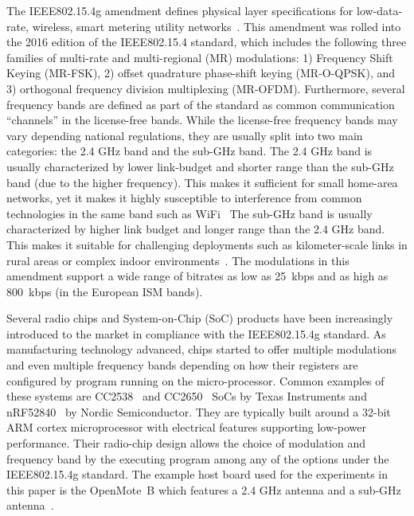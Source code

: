 \documentclass[sensors,article,submit,moreauthors,pdftex]{Definitions/mdpi}
\begin{document}
The IEEE802.15.4g amendment defines physical layer specifications for low-data-rate, wireless, smart metering utility networks~\cite{std_ieee802154g}.
This amendment was rolled into the 2016 edition of the IEEE802.15.4 standard, which includes the following three families of multi-rate and multi-regional (MR) modulations: 1) Frequency Shift Keying (MR-FSK), 2) offset quadrature phase-shift keying (MR-O-QPSK), and 3) orthogonal frequency division multiplexing (MR-OFDM).
Furthermore, several frequency bands are defined as part of the standard as common communication ``channels'' in the license-free bands.
While the license-free frequency bands may vary depending national regulations, they are usually split into two main categories: the 2.4 GHz band and the sub-GHz band. 
The 2.4 GHz band is usually characterized by lower link-budget and shorter range than the sub-GHz band (due to the higher frequency). 
This makes it sufficient for small home-area networks, yet it makes it highly susceptible to interference from common technologies in the same band such as WiFi~\cite{tuset19experimental}
The sub-GHz band is usually characterized by higher link budget and longer range than the 2.4 GHz band. 
This makes it suitable for challenging deployments such as kilometer-scale links in rural areas or complex indoor environments~\cite{munoz19km}.
The modulations in this amendment support a wide range of bitrates as low as 25~kbps and as high as 800~kbps (in the European ISM bands).


Several radio chips and System-on-Chip (SoC) products have been increasingly introduced to the market in compliance with the IEEE802.15.4g standard. 
As manufacturing technology advanced, chips started to offer multiple modulations and even multiple frequency bands depending on how their registers are configured by program running on the micro-processor.
Common examples of these systems are CC2538~\cite{datasheet_cc2538} and CC2650~\cite{datasheet_cc2650} SoCs by Texas Instruments and nRF52840~\cite{datasheet_nrf52840} by Nordic Semiconductor. 
They are typically built around a 32-bit ARM cortex microprocessor with electrical features supporting low-power performance.
Their radio-chip design allows the choice of modulation and frequency band by the executing program among any of the options under the IEEE802.15.4g standard. 
The example host board used for the experiments in this paper is the OpenMote~B which features a 2.4 GHz antenna and a sub-GHz antenna~\cite{tuset16openmote}.
\end{document}
